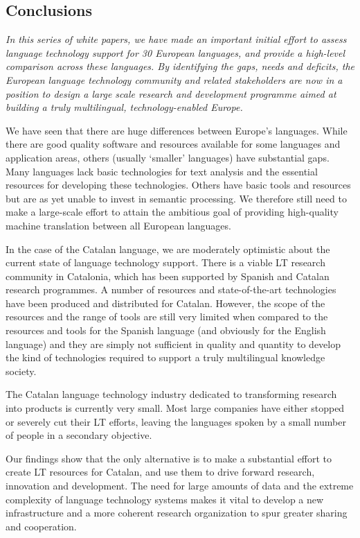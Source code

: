 \documentclass[]{../../metanetpaper}
\begin{document}
\begin{multicols}{2}
\subsection{Conclusions}

    \emph{In this series of white papers, we have made an important initial effort to assess language technology support for 30 European languages, and provide a high-level comparison across these languages. By identifying the gaps, needs and deficits, the European language technology community and related stakeholders are now in a position to design a large scale research and development programme aimed at building a truly multilingual, technology-enabled Europe.}

    We have seen that there are huge differences between Europe’s languages. While there are good quality software and resources available for some languages and application areas, others (usually ‘smaller’ languages) have substantial gaps. Many languages lack basic technologies for text analysis and the essential resources for developing these technologies. Others have basic tools and resources but are as yet unable to invest in semantic processing. We therefore still need to make a large-scale effort to attain the ambitious goal of providing high-quality machine translation between all European languages. 

    In the case of the Catalan language, we are moderately optimistic about the current state of language technology support. There is a viable LT research community in Catalonia, which has been supported by Spanish and Catalan research programmes. A number of resources and state-of-the-art technologies have been produced and distributed for Catalan. However, the scope of the resources and the range of tools are still very limited when compared to the resources and tools for the Spanish language (and obviously for the English language) and they are simply not sufficient in quality and quantity to develop the kind of technologies required to support a truly multilingual knowledge society.

    The Catalan language technology industry dedicated to transforming research into products is currently very small. Most large companies have either stopped or severely cut their LT efforts, leaving the languages spoken by a small number of people in a secondary objective.

    Our findings show that the only alternative is to make a substantial effort to create LT resources for Catalan, and use them to drive forward research, innovation and development. The need for large amounts of data and the extreme complexity of language technology systems makes it vital to develop a new infrastructure and a more coherent research organization to spur greater sharing and cooperation.


\end{multicols}
\end{document}
